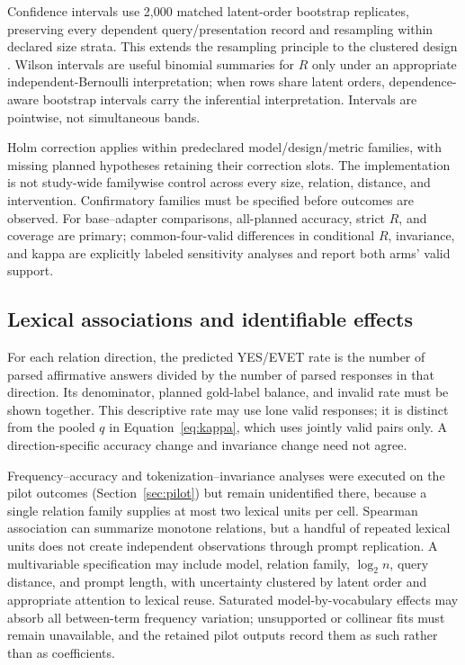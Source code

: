 Confidence intervals use 2,000 matched latent-order bootstrap replicates, preserving every dependent
query/presentation record and resampling within declared size strata. This extends the resampling principle
\citep{efron1979bootstrap} to the clustered design \citep{field2007clustered}. Wilson intervals
\citep{wilson1927} are useful binomial summaries for $R$ only under an appropriate independent-Bernoulli
interpretation; when rows share latent orders, dependence-aware bootstrap intervals carry the inferential
interpretation. Intervals are pointwise, not simultaneous bands.

Holm correction \citep{holm1979} applies within predeclared model/design/metric families, with missing
planned hypotheses retaining their correction slots. The implementation is not study-wide familywise
control across every size, relation, distance, and intervention. Confirmatory families must be specified
before outcomes are observed. For base--adapter comparisons, all-planned accuracy, strict $R$, and coverage
are primary; common-four-valid differences in conditional $R$, invariance, and kappa are explicitly labeled
sensitivity analyses and report both arms' valid support.

\subsection{Lexical associations and identifiable effects}

For each relation direction, the predicted YES/EVET rate is the number of parsed affirmative answers divided
by the number of parsed responses in that direction. Its denominator, planned gold-label balance, and
invalid rate must be shown together. This descriptive rate may use lone valid responses; it is distinct from
the pooled $q$ in Equation~\eqref{eq:kappa}, which uses jointly valid pairs only. A direction-specific
accuracy change and invariance change need not agree.

Frequency--accuracy and tokenization--invariance analyses were executed on the pilot outcomes
(Section~\ref{sec:pilot}) but remain unidentified there, because a single relation family supplies at most
two lexical units per cell. Spearman association \citep{spearman1904} can summarize monotone relations, but
a handful of repeated lexical units does not create independent observations through prompt replication. A
multivariable specification may include model, relation family, $\log_2 n$, query distance, and prompt
length, with uncertainty clustered by latent order and appropriate attention to lexical reuse. Saturated
model-by-vocabulary effects may absorb all between-term frequency variation; unsupported or collinear fits
must remain unavailable, and the retained pilot outputs record them as such rather than as coefficients.

